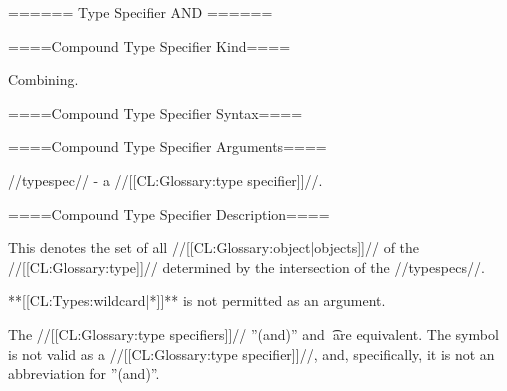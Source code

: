 ====== Type Specifier AND ======

====Compound Type Specifier Kind====

Combining.

====Compound Type Specifier Syntax====


====Compound Type Specifier Arguments====

//typespec// - a //[[CL:Glossary:type specifier]]//.

====Compound Type Specifier Description====

This denotes the set of all //[[CL:Glossary:object|objects]]// of the //[[CL:Glossary:type]]// determined by the intersection of the //typespecs//.

**[[CL:Types:wildcard|*]]** is not permitted as an argument.

The //[[CL:Glossary:type specifiers]]// ''(and)'' and \t\ are equivalent. The symbol  is not valid as a //[[CL:Glossary:type specifier]]//, and, specifically, it is not an abbreviation for ''(and)''.

